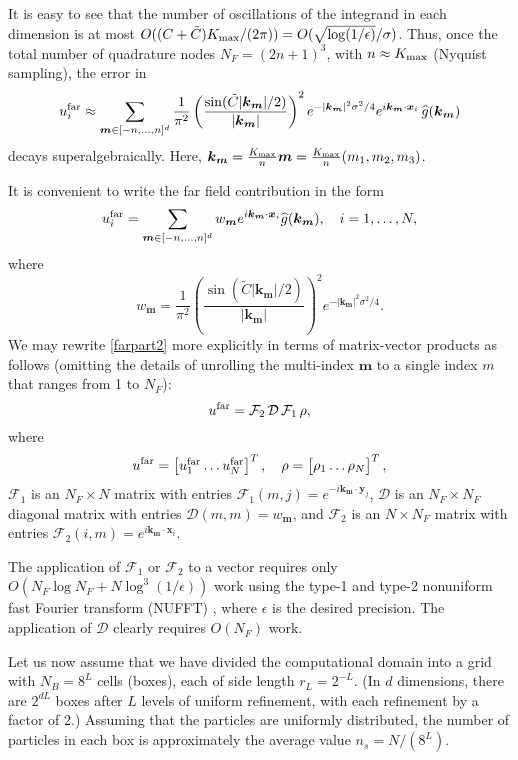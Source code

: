 \documentclass[final,letterpaper]{siamart171218}
\newcommand{\be}{\begin{equation}}
\newcommand{\ee}{\end{equation}}
\newcommand{\x}{\boldsymbol{x}}
\newcommand{\y}{\boldsymbol{y}}
\newcommand{\bk}{\boldsymbol{k}}
\newcommand{\bm}{\boldsymbol{m}}
\newcommand{\cf}{\mathcal{F}}
\newcommand{\cd}{\mathcal{D}}
\newcommand{\cR}{r}
\begin{document}
It is easy to see that
the number of oscillations of the integrand 
in each dimension is at most $O((C+\tilde{C})K_{\rm max}/(2\pi))
= O(\sqrt{ \log(1/\epsilon)}/\sigma)$.
Thus, once the total number of quadrature nodes  $N_F = (2n+1)^3$, 
with $n \approx K_{\rm max}$ (Nyquist sampling), the error in
\be\label{truncatedkernelfourierrep}
u_{i}^{\rm far} 
\approx \sum_{\bm \in [-n,\dots,n]^d} \frac{1}{\pi^2} 
\left(\frac{\sin(\tilde{C}|\bk_{\bm}|/2)}
{|\bk_{\bm}|}\right)^2
e^{-|\bk_{\bm}|^2 \sigma^2/4} e^{i\bk_{\bm} \cdot \x_i} \,\widehat{g}(\bk_{\bm})
\ee
decays superalgebraically.
Here, $\bk_{\bm} = \frac{K_{\rm max}}{n} \bm = \frac{K_{\rm max}}{n} (m_1,m_2,m_3)$.

It is convenient to write the far field contribution in the form
\be\label{farpart2}
u_{i}^{\rm far}=\sum_{\bm \in [-n,\dots,n]^d} 
w_{\bm} e^{i\bk_{\bm} \cdot \x_i}  \widehat{g}(\bk_{\bm}), \quad i=1,\ldots,N,
\ee
where
\be\label{farpart2form}
w_{\bm}  =  \frac{1}{\pi^2} \left(\frac{\sin(\tilde{C}|\bk_{\bm}|/2)}{|\bk_{\bm}|}\right)^2
e^{-|\bk_{\bm}|^2\sigma^2/4}.
\ee
We may rewrite \cref{farpart2} more explicitly in terms of matrix-vector products 
as follows (omitting the details of unrolling the multi-index $\bm$ 
to a single index $m$ that ranges from 1 to $N_F$):
\be
\label{farpart3}
u^{\rm far}= \cf_2 \, \cd \, \cf_1 \, \rho, 
\ee
where
\be
u^{\rm far}=\begin{bmatrix} u_{1}^{\rm far} \ldots u_{N}^{\rm far}\end{bmatrix}^T, \quad
\rho=\begin{bmatrix} \rho_1 \ldots \rho_N\end{bmatrix}^T,
\ee
$\cf_1$ is an $N_F\times N$ matrix with entries $\cf_{1}(m,j)=e^{-i\bk_{\bm}\cdot \y_j}$,
$\cd$ is an $N_F\times N_F$ diagonal matrix with entries
$\cd(m,m)=w_{\bm}$,
and $\cf_2$ is an $N\times N_F$ matrix with entries $\cf_{2}(i,m)=e^{i\bk_{\bm}\cdot \x_i}$.

The application of $\cf_1$ or $\cf_2$ to a vector requires
only $O(N_F\log N_F + N \log^3(1/\epsilon))$ work using the 
type-1 and type-2 nonuniform fast Fourier transform (NUFFT) 
\cite{finufft,finufftlib,nufft2,nufft3,nufft6,potts2004},
where $\epsilon$ is the desired precision. The application
of $\cd$ clearly requires $O(N_F)$ work.

Let us now assume that we have divided
the computational domain into a grid with $N_B= 8^L$ 
cells (boxes), each of side length $\cR_L=2^{-L}$. (In $d$ dimensions,
there are $2^{dL}$ boxes after $L$ levels of uniform refinement, with each
refinement by a factor of 2.)
Assuming that the particles are uniformly distributed, the 
number of particles in each box is approximately the average value $n_s=N/(8^L)$. 
\end{document}

